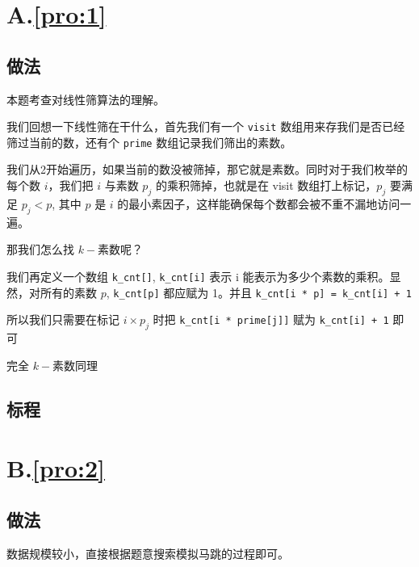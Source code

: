 \documentclass[
	lang=cn,
	color=blue
]{elegantbook}
\begin{document}
\chapter*{A.\quad \ref*{pro:1}}
\section*{做法}

本题考查对线性筛算法的理解。

我们回想一下线性筛在干什么，首先我们有一个 \verb|visit| 数组用来存我们是否已经筛过当前的数，还有个 \verb|prime| 数组记录我们筛出的素数。

我们从2开始遍历，如果当前的数没被筛掉，那它就是素数。同时对于我们枚举的每个数 $i$，我们把 $i$ 与素数 $p_j$ 的乘积筛掉，也就是在 visit 数组打上标记，$p_j$ 要满足 $p_j<p$, 其中 $p$ 是 $i$ 的最小素因子，这样能确保每个数都会被不重不漏地访问一遍。

那我们怎么找 $k-$素数呢？

我们再定义一个数组 \verb|k_cnt[]|, \verb|k_cnt[i]| 表示 i 能表示为多少个素数的乘积。显然，对所有的素数 $p$, \verb|k_cnt[p]| 都应赋为 1。并且 \verb|k_cnt[i * p] = k_cnt[i] + 1|

所以我们只需要在标记 $i\times p_j$ 时把 \verb|k_cnt[i * prime[j]]| 赋为 \verb|k_cnt[i] + 1| 即可

完全 $k-$素数同理

\section*{标程}

\chapter*{B.\quad \ref*{pro:2}}
\section*{做法}
数据规模较小，直接根据题意搜索模拟马跳的过程即可。
\end{document}
